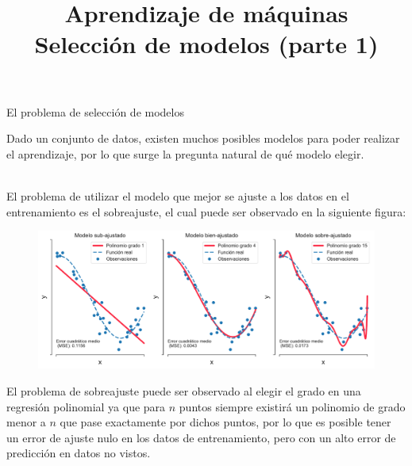 \documentclass[9pt]{beamer}
\title{\textbf{Aprendizaje de máquinas} \\ Selección de modelos (parte 1)}
\begin{document}
\begin{frame}
  \titlepage
\end{frame}

\begin{frame}{El problema de selección de modelos}

Dado un conjunto de datos, existen muchos posibles modelos para poder realizar el aprendizaje, por lo que surge la pregunta natural de qué modelo elegir. \\~\ \pause

El problema de utilizar el modelo que mejor se ajuste a los datos en el entrenamiento es el sobreajuste, el cual puede ser observado en la siguiente figura:
\begin{figure}[h!]
    \centering
    \includegraphics[width = 0.8\linewidth]{../img/cap4_ajuste.pdf}
\end{figure}\pause

El problema de sobreajuste puede ser observado al elegir el grado en una regresión polinomial ya que para $n$ puntos siempre existirá un polinomio de grado menor a $n$ que pase exactamente por dichos puntos, por lo que es posible tener un error de ajuste nulo en los datos de entrenamiento, pero con un alto error de predicción en datos no vistos.

\end{frame}
\end{document}
